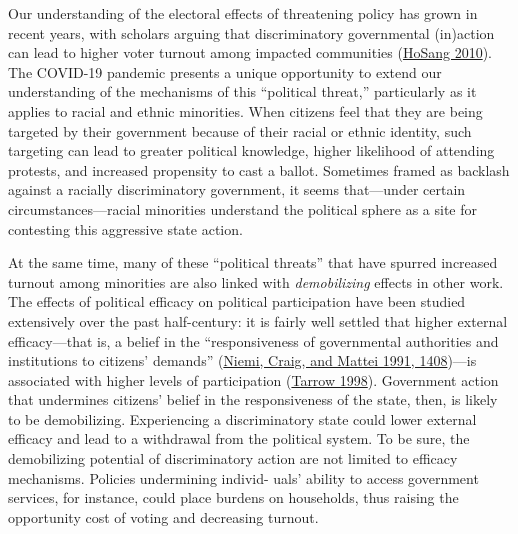 \documentclass[
  12pt,
]{article}
\begin{document}
Our understanding of the electoral effects of threatening policy has grown in recent years, with scholars arguing that discriminatory governmental (in)action can lead to higher voter turnout among impacted communities (\protect\hyperlink{ref-HoSang2010}{HoSang 2010}). The COVID-19 pandemic presents a unique opportunity to extend our understanding of the mechanisms of this ``political threat,'' particularly as it applies to racial and ethnic minorities. When citizens feel that they are being targeted by their government because of their racial or ethnic identity, such targeting can lead to greater political knowledge, higher likelihood of attending protests, and increased propensity to cast a ballot. Sometimes framed as backlash against a racially discriminatory government, it seems that---under certain circumstances---racial minorities understand the political sphere as a site for contesting this aggressive state action.

At the same time, many of these ``political threats'' that have spurred increased turnout among minorities are also linked with \emph{demobilizing} effects in other work. The effects of political efficacy on political participation have been studied extensively over the past half-century: it is fairly well settled that higher external efficacy---that is, a belief in the ``responsiveness of governmental authorities and institutions to citizens' demands'' (\protect\hyperlink{ref-Niemi1991}{Niemi, Craig, and Mattei 1991, 1408})---is associated with higher levels of participation (\protect\hyperlink{ref-Tarrow1998}{Tarrow 1998}). Government action that undermines citizens' belief in the responsiveness of the state, then, is likely to be demobilizing. Experiencing a discriminatory state could lower external efficacy and lead to a withdrawal from the political system. To be sure, the demobilizing potential of discriminatory action are not limited to efficacy mechanisms. Policies undermining individ- uals' ability to access government services, for instance, could place burdens on households, thus raising the opportunity cost of voting and decreasing turnout.
\end{document}
